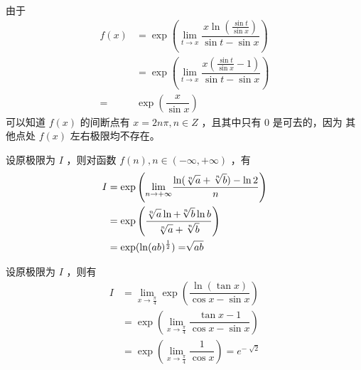\begin{Answer}
    由于
    \begin{equation*}
        \begin{aligned}
            f(x) &= \exp \left({\displaystyle\lim_{t\rightarrow x}}
            \dfrac{x\ln(\frac{\sin t}{\sin x})}{\sin t-\sin x}\right)\\ 
            &= \exp \left(\lim_{t\rightarrow x}\dfrac{x(\frac{\sin t}{\sin x}-1)}{\sin t-\sin x}\right)\\ 
            =& \exp(\dfrac{x}{\sin x})
        \end{aligned}
    \end{equation*}
    可以知道 $ f(x) $ 的间断点有 $ x = 2n\pi, n\in Z $ ，且其中只有 $ 0 $ 是可去的，因为
    其他点处 $ f(x) $ 左右极限均不存在。
\end{Answer}

\begin{Answer}[不要认为令 $ a = b = 1 $ 的结果一定能代表答案\getback{T4}]
    设原极限为 $ I $ ，则对函数 $ f(n),n\in (-\infty,+\infty) $ ，有
    \begin{equation*}
        \begin{aligned}
            I &= \exp \left({\displaystyle\lim_{n\rightarrow +\infty}}
            \dfrac{\ln(\displaystyle\sqrt[n]{a}+\displaystyle\sqrt[n]{b})-\ln 2}{n} \right)\\ &=
            \exp\left(\dfrac{\displaystyle\sqrt[n]{a}\ln+\displaystyle\sqrt[n]{b}\ln b}{\displaystyle\sqrt[n]{a}+\displaystyle\sqrt[n]{b}}\right)
            \\&= \exp(\ln (ab)^\frac{1}{2}) = \displaystyle\sqrt[]{ab}
        \end{aligned}
    \end{equation*}
\end{Answer}

\begin{Answer}
    设原极限为 $ I $ ，则有
    \begin{equation*}
        \begin{aligned}
            I &= {\displaystyle\lim_{x\rightarrow \frac{\pi}{4}}}\exp\left(\dfrac{\ln (\tan x)}
            {\cos x - \sin x}\right) \\&= \exp\left({\displaystyle\lim_{x\rightarrow \frac{\pi}{4}}}
            \dfrac{\tan x - 1}{\cos x - \sin x}\right) \\&=
            \exp({\displaystyle\lim_{x\rightarrow \frac{\pi}{4}}} \dfrac{1}{\cos x}) = e^{-\sqrt[]{2}}
        \end{aligned}
    \end{equation*}
\end{Answer}

